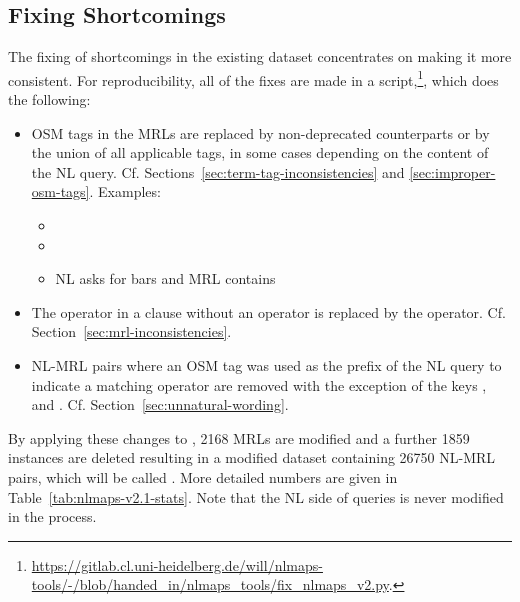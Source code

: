 \subsection{Fixing \nlmapstwo{} Shortcomings}

The fixing of shortcomings in the existing dataset concentrates on making it
more consistent. For reproducibility, all of the fixes are made in a
script,\footnote{\url{https://gitlab.cl.uni-heidelberg.de/will/nlmaps-tools/-/blob/handed_in/nlmaps_tools/fix_nlmaps_v2.py}.},
which does the following:

\begin{itemize}
\item OSM tags in the MRLs are replaced by non-deprecated counterparts or by the
  union of all applicable tags, in some cases depending on the content of the NL
  query. Cf. Sections~\ref{sec:term-tag-inconsistencies} and
  \ref{sec:improper-osm-tags}. Examples:
  \begin{itemize}
  \item {} \textrightarrow{} 
  \item {} \textrightarrow{} 
  \item NL asks for bars and MRL contains  \textrightarrow{}
  \end{itemize}

\item The operator  in a  clause without an 
  operator is replaced by the  operator. Cf.
  Section~\ref{sec:mrl-inconsistencies}.

\item NL-MRL pairs where an OSM tag was used as the prefix of the NL query to
  indicate a matching  operator are removed with the exception of
  the keys ,  and . Cf.
  Section~\ref{sec:unnatural-wording}.
\end{itemize}

By applying these changes to \nlmapstwo{}, \num{2168} MRLs are modified and a
further \num{1859} instances are deleted resulting in a modified dataset
containing \num{26750} NL-MRL pairs, which will be called \nlmapstwoone{}. More
detailed numbers are given in Table~\ref{tab:nlmaps-v2.1-stats}. Note that the
NL side of queries is never modified in the process.

